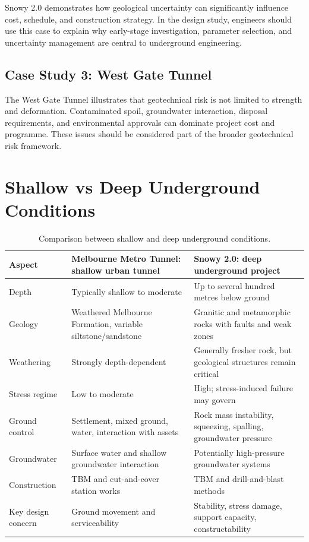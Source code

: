 \begin{warnbox}
Snowy 2.0 demonstrates how geological uncertainty can significantly influence cost, schedule, and construction strategy. In the design study, engineers should use this case to explain why early-stage investigation, parameter selection, and uncertainty management are central to underground engineering.
\end{warnbox}

\subsection{Case Study 3: West Gate Tunnel}

\begin{warnbox}
The West Gate Tunnel illustrates that geotechnical risk is not limited to strength and deformation. Contaminated spoil, groundwater interaction, disposal requirements, and environmental approvals can dominate project cost and programme. These issues should be considered part of the broader geotechnical risk framework.
\end{warnbox}

\section{Shallow vs Deep Underground Conditions}

\begin{table}[H]
\centering
\small
\begin{tabularx}{\textwidth}{l X X}
\toprule
\textbf{Aspect} & \textbf{Melbourne Metro Tunnel: shallow urban tunnel} & \textbf{Snowy 2.0: deep underground project} \\
\midrule
Depth & Typically shallow to moderate & Up to several hundred metres below ground \\
Geology & Weathered Melbourne Formation, variable siltstone/sandstone & Granitic and metamorphic rocks with faults and weak zones \\
Weathering & Strongly depth-dependent & Generally fresher rock, but geological structures remain critical \\
Stress regime & Low to moderate & High; stress-induced failure may govern \\
Ground control & Settlement, mixed ground, water, interaction with assets & Rock mass instability, squeezing, spalling, groundwater pressure \\
Groundwater & Surface water and shallow groundwater interaction & Potentially high-pressure groundwater systems \\
Construction & TBM and cut-and-cover station works & TBM and drill-and-blast methods \\
Key design concern & Ground movement and serviceability & Stability, stress damage, support capacity, constructability \\
\bottomrule
\end{tabularx}
\caption{Comparison between shallow and deep underground conditions.}
\end{table}

